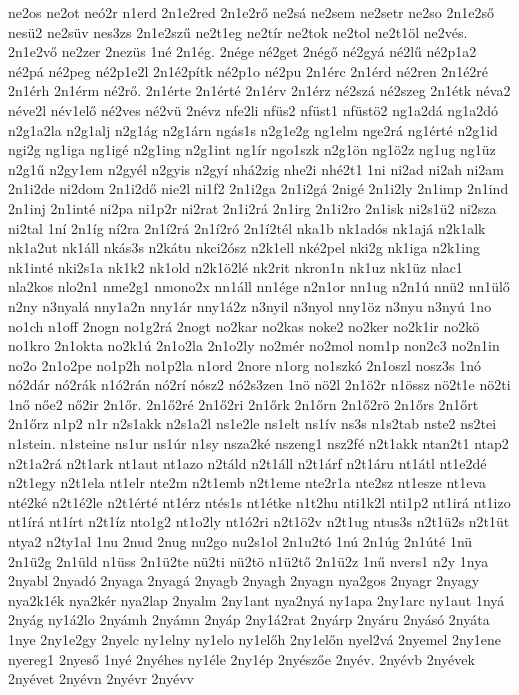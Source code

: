 {ne2os
ne2ot
neó2r
n1erd
2n1e2red
2n1e2rő
ne2sá
ne2sem
ne2setr
ne2so
2n1e2ső
nesü2
ne2süv
nes3zs
2n1e2szű
ne2t1eg
ne2tír
ne2tok
ne2tol
ne2t1öl
ne2vés.
2n1e2vő
ne2zer
2nezüs
1né
2n1ég.
2nége
né2get
2négő
né2gyá
né2lű
né2p1a2
né2pá
né2peg
né2p1e2l
2n1é2pítk
né2p1o
né2pu
2n1érc
2n1érd
né2ren
2n1é2ré
2n1érh
2n1érm
né2rő.
2n1érte
2n1érté
2n1érv
2n1érz
né2szá
né2szeg
2n1étk
néva2
néve2l
név1elő
né2ves
né2vü
2névz
nfe2li
nfüs2
nfüst1
nfüstö2
ng1a2dá
ng1a2dó
n2g1a2la
n2g1alj
n2g1ág
n2g1árn
ngás1s
n2g1e2g
ng1elm
nge2rá
ng1érté
n2g1id
ngi2g
ng1iga
ng1igé
n2g1ing
n2g1int
ng1ír
ngo1szk
n2g1ön
ng1ö2z
ng1ug
ng1üz
n2g1ű
n2gy1em
n2gyél
n2gyis
n2gyí
nhá2zig
nhe2i
nhé2t1
1ni
ni2ad
ni2ah
ni2am
2n1i2de
ni2dom
2n1i2dő
nie2l
ni1f2
2n1i2ga
2n1i2gá
2nigé
2n1i2ly
2n1imp
2n1ind
2n1inj
2n1inté
ni2pa
ni1p2r
ni2rat
2n1i2rá
2n1irg
2n1i2ro
2n1isk
ni2s1ü2
ni2sza
ni2tal
1ní
2n1íg
ní2ra
2n1í2rá
2n1í2ró
2n1í2tél
nka1b
nk1adós
nk1ajá
n2k1alk
nk1a2ut
nk1áll
nkás3s
n2kátu
nkci2ósz
n2k1ell
nké2pel
nki2g
nk1iga
n2k1ing
nk1inté
nki2s1a
nk1k2
nk1old
n2k1ö2lé
nk2rit
nkron1n
nk1uz
nk1üz
nlac1
nla2kos
nlo2n1
nme2g1
nmono2x
nn1áll
nn1ége
n2n1or
nn1ug
n2n1ú
nnü2
nn1ülő
n2ny
n3nyalá
nny1a2n
nny1ár
nny1á2z
n3nyil
n3nyol
nny1öz
n3nyu
n3nyú
1no
no1ch
n1off
2nogn
no1g2rá
2nogt
no2kar
no2kas
noke2
no2ker
no2k1ir
no2kö
no1kro
2n1okta
no2k1ú
2n1o2la
2n1o2ly
no2mér
no2mol
nom1p
non2c3
no2n1in
no2o
2n1o2pe
no1p2h
no1p2la
n1ord
2nore
n1org
no1szkó
2n1oszl
nosz3s
1nó
nó2dár
nó2rák
n1ó2rán
nó2rí
nósz2
nó2s3zen
1nö
nö2l
2n1ö2r
n1össz
nö2t1e
nö2ti
1nő
nőe2
nő2ir
2n1őr.
2n1ő2ré
2n1ő2ri
2n1őrk
2n1őrn
2n1ő2rö
2n1őrs
2n1őrt
2n1őrz
n1p2
n1r
n2s1akk
n2s1a2l
ns1e2le
ns1elt
ns1ív
ns3s
n1s2tab
nste2
ns2tei
n1stein.
n1steine
ns1ur
ns1úr
n1sy
nsza2ké
nszeng1
nsz2fé
n2t1akk
ntan2t1
ntap2
n2t1a2rá
n2t1ark
nt1aut
nt1azo
n2táld
n2t1áll
n2t1árf
n2t1áru
nt1átl
nt1e2dé
n2t1egy
n2t1ela
nt1elr
nte2m
n2t1emb
n2t1eme
nte2r1a
nte2sz
nt1esze
nt1eva
nté2ké
n2t1é2le
n2t1érté
nt1érz
ntés1s
nt1étke
n1t2hu
nti1k2l
nti1p2
nt1irá
nt1izo
nt1írá
nt1írt
n2t1íz
nto1g2
nt1o2ly
nt1ó2ri
n2t1ö2v
n2t1ug
ntus3s
n2t1ü2s
n2t1üt
ntya2
n2ty1al
1nu
2nud
2nug
nu2go
nu2s1ol
2n1u2tó
1nú
2n1úg
2n1úté
1nü
2n1ü2g
2n1üld
n1üss
2n1ü2te
nü2ti
nü2tö
n1ü2tő
2n1ü2z
1nű
nvers1
n2y
1nya
2nyabl
2nyadó
2nyaga
2nyagá
2nyagb
2nyagh
2nyagn
nya2gos
2nyagr
2nyagy
nya2k1ék
nya2kér
nya2lap
2nyalm
2ny1ant
nya2nyá
ny1apa
2ny1arc
ny1aut
1nyá
2nyág
ny1á2lo
2nyámh
2nyámn
2nyáp
2ny1á2rat
2nyárp
2nyáru
2nyásó
2nyáta
1nye
2ny1e2gy
2nyelc
ny1elny
ny1elo
ny1előh
2ny1előn
nyel2vá
2nyemel
2ny1ene
nyereg1
2nyeső
1nyé
2nyéhes
ny1éle
2ny1ép
2nyészőe
2nyév.
2nyévb
2nyévek
2nyévet
2nyévn
2nyévr
2nyévv
}
